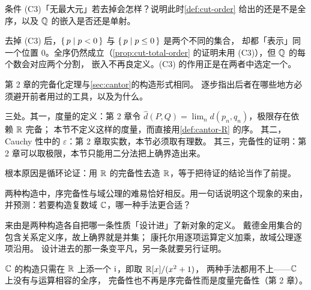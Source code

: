 \begin{exercise}[结构]
  \label{exr:why-C3}
  条件 (C3)「无最大元」若去掉会怎样？说明此时\cref{def:cut-order}
  给出的还是不是全序，以及 \(\mathbb{Q}\) 的嵌入是否还是单射。
  \begin{solution}
    去掉 (C3) 后，\(\left\{\,p \;\middle|\; p<0\,\right\}\) 与 \(\left\{\,p \;\middle|\; p\le 0\,\right\}\) 是两个不同的集合，
    却都「表示」同一个位置 \(0\)。全序仍然成立（\cref{prop:cut-total-order}
    的证明未用 (C3)），但 \(\mathbb{Q}\) 的每个数会对应两个分割，
    嵌入不再良定义。(C3) 的作用正是在两者中选定一个。
  \end{solution}
\end{exercise}

\begin{exercise}[结构]
  \label{exr:cantor-no-circular}
  第 2 章的完备化定理与\cref{sec:cantor}的构造形式相同。
  逐步指出后者在哪些地方必须避开前者用过的工具，以及为什么。
  \begin{solution}
    三处。其一，度量的定义：第 2 章令
    \(\widehat{d}(P,Q)=\lim_{n} d(p_{n},q_{n})\)，极限存在依赖 \(\mathbb{R}\) 完备；
    本节不定义这样的度量，而直接用\cref{def:cantor-R} 的序。
    其二，Cauchy 性中的 \(\varepsilon\)：第 2 章取实数，本节必须取有理数。
    其三，完备性的证明：第 2 章可以取极限，本节只能用二分法把上确界造出来。

    根本原因是循环论证：用 \(\mathbb{R}\) 的完备性去造 \(\mathbb{R}\)，等于把待证的结论当作了前提。
  \end{solution}
\end{exercise}

\begin{exercise}[延伸]
  \label{exr:construction-compare}
  两种构造中，序完备性与域公理的难易恰好相反。用一句话说明这个现象的来由，
  并预测：若要构造复数域 \(\mathbb{C}\)，哪一种手法更合适？
  \begin{solution}
    来由是两种构造各自把哪一条性质「设计进」了新对象的定义。
    戴德金用集合的包含关系定义序，故上确界就是并集；
    康托尔用逐项运算定义加乘，故域公理逐项沿用。
    设计进去的那一条变平凡，另一条就要另行证明。

    \(\mathbb{C}\) 的构造只需在 \(\mathbb{R}\) 上添一个 \(\mathrm{i}\)，即取 \(\mathbb{R}[x]/(x^{2}+1)\)，
    两种手法都用不上——\(\mathbb{C}\) 上没有与运算相容的全序，
    完备性也不再是序完备性而是度量完备性（第 2 章）。
  \end{solution}
\end{exercise}

